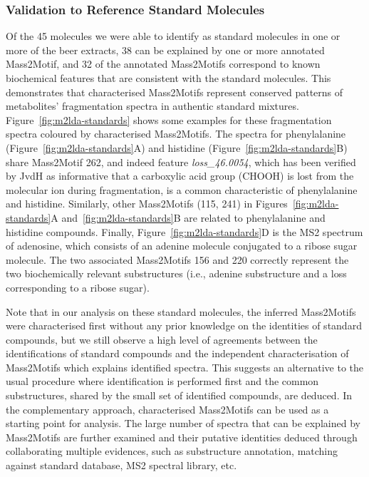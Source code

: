 \subsubsection{Validation to Reference Standard Molecules}

Of the 45 molecules we were able to identify as standard molecules in one or more of the beer extracts, 38 can be explained by one or more annotated Mass2Motif, and 32 of the annotated Mass2Motifs correspond to known biochemical features that are consistent with the standard molecules. This demonstrates that characterised Mass2Motifs represent conserved patterns of metabolites' fragmentation spectra in authentic standard mixtures. Figure~\ref{fig:m2lda-standards} shows some examples for these fragmentation spectra coloured by characterised Mass2Motifs. The spectra for phenylalanine (Figure~\ref{fig:m2lda-standards}A) and histidine (Figure~\ref{fig:m2lda-standards}B) share Mass2Motif 262, and indeed feature \textit{loss\_46.0054}, which has been verified by JvdH as informative that a carboxylic acid group (CHOOH) is lost from the molecular ion during fragmentation, is a common characteristic of phenylalanine and histidine. Similarly, other Mass2Motifs (115, 241) in Figures~\ref{fig:m2lda-standards}A and~\ref{fig:m2lda-standards}B are related to phenylalanine and histidine compounds. Finally, Figure~\ref{fig:m2lda-standards}D is the MS2 spectrum of adenosine, which consists of an adenine molecule conjugated to a ribose sugar molecule. The two associated Mass2Motifs 156 and 220 correctly represent the two biochemically relevant substructures (i.e., adenine substructure and a loss corresponding to a ribose sugar). 

Note that in our analysis on these standard molecules, the inferred Mass2Motifs were characterised first without any prior knowledge on the identities of standard compounds, but we still observe a high level of agreements between the identifications of standard compounds and the independent characterisation of Mass2Motifs which explains identified spectra. This suggests an alternative to the usual procedure where identification is performed first and the common substructures, shared by the small set of identified compounds, are deduced. In the complementary approach, characterised Mass2Motifs can be used as a starting point for analysis. The large number of spectra that can be explained by Mass2Motifs are further examined and their putative identities deduced through collaborating multiple evidences, such as substructure annotation, matching against standard database, MS2 spectral library, etc. 

